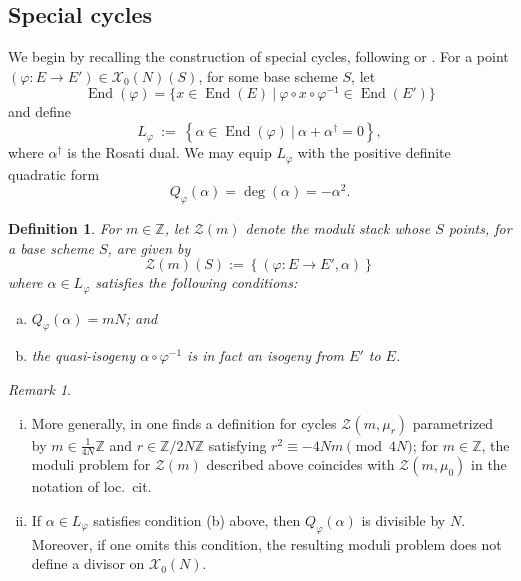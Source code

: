\documentclass[reqno,oneside]{amsart}
\theoremstyle{plain}
\newtheorem{definition}[theorem]{Definition}
\theoremstyle{remark}
\newtheorem{remark}[theorem]{Remark}
\numberwithin{theorem}{section}
\newcommand{\bbZ}{\mathbb Z}
\newcommand{\calX}{\mathcal X}
\newcommand{\calZ}{\mathcal Z}
\DeclareMathOperator{\End}{End}
\begin{document}
	\subsection{Special cycles}
	We begin by recalling the construction of special cycles, following  \cite{DuYang} or \cite{BruinierYang}.
	For a point $(\varphi \colon E \to E') \in \calX_0(N)(S)$, for some base scheme $S$, let
	\begin{equation}
	\End(\varphi) = \{  x \in \End(E) \ | \ \varphi \circ x \circ \varphi^{-1} \in \End(E')  \}
	\end{equation}	
	and define
	\begin{equation} \label{eqn:moduli lattice def}
	L_{\varphi} \ := \ \left\{ \alpha \in \End(\varphi) \ | \ \alpha + \alpha^{\dagger} = 0 \right\},
	\end{equation}
	where $\alpha^{\dagger}$ is the Rosati dual. We may equip $L_{\varphi}$ with the positive definite quadratic form
	\begin{equation}
	Q_{\varphi}(\alpha) = \deg (\alpha) = -  \alpha^2.
	\end{equation}
	
	
	
	\begin{definition} \label{def:special divisors moduli} For $m\in \bbZ$, let $\calZ(m)$ denote the moduli stack whose $S$ points, for a base scheme $S$, are given by	
		\begin{equation}
		\calZ(m)(S) := \left\{	(\varphi \colon E \to E', \alpha) \right\}
		\end{equation}
		where $\alpha \in L_{\varphi}$ satisfies  the following conditions:
		\begin{enumerate}[(a)]
			\item $Q_{\varphi}(\alpha) = mN$;
			and
			\item  the quasi-isogeny $\alpha \circ \varphi^{-1}$ is in fact an isogeny from $E'$ to $E$.
		\end{enumerate}
	\end{definition}
	
	
	\begin{remark}
		\begin{enumerate}[(i)]
			\item
		More generally, in  \cite{DuYang,BruinierYang} one finds a definition for cycles $\calZ(m, \mu_r)$ parametrized by $m \in \frac{1}{4N}\bbZ$ and $r \in \bbZ/2N \bbZ$ satisfying $r^2 \equiv -4 Nm \pmod{4N}$; for $m \in \bbZ$, the moduli problem for $\calZ(m)$ described above coincides with $\calZ(m, \mu_0)$ in the notation of loc.\ cit.\
			\item If $\alpha \in L_{\varphi}$ satisfies condition (b) above, then  $Q_{\varphi}(\alpha)$ is divisible by $N$. Moreover, if one omits this condition, the resulting moduli problem does not define a divisor on $\mathcal X_0(N)$.
		\end{enumerate}
	\end{remark}
	
\end{document}
